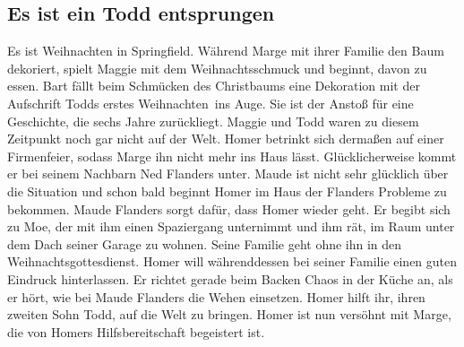 
\subsection{Es ist ein Todd entsprungen}\label{QABF09}
Es ist Weihnachten in Springfield. Während Marge mit ihrer Familie den Baum dekoriert, spielt Maggie mit dem Weihnachtsschmuck und beginnt, davon zu essen. Bart fällt beim Schmücken des Christbaums eine Dekoration mit der Aufschrift \glqq Todds erstes Weihnachten\grqq\ ins Auge. Sie ist der Anstoß für eine Geschichte, die sechs Jahre zurückliegt. Maggie und Todd waren zu diesem Zeitpunkt noch gar nicht auf der Welt. Homer betrinkt sich dermaßen auf einer Firmenfeier, sodass Marge ihn nicht mehr ins Haus lässt. Glücklicherweise kommt er bei seinem Nachbarn Ned Flanders unter. Maude ist nicht sehr glücklich über die Situation und schon bald beginnt Homer im Haus der Flanders Probleme zu bekommen. Maude Flanders sorgt dafür, dass Homer wieder geht. Er begibt sich zu Moe, der mit ihm einen Spaziergang unternimmt und ihm rät, im Raum unter dem Dach seiner Garage zu wohnen. Seine Familie geht ohne ihn in den Weihnachtsgottesdienst. Homer will währenddessen bei seiner Familie einen guten Eindruck hinterlassen. Er richtet gerade beim Backen Chaos in der Küche an, als er hört, wie bei Maude Flanders die Wehen einsetzen. Homer hilft ihr, ihren zweiten Sohn Todd, auf die Welt zu bringen. Homer ist nun versöhnt mit Marge, die von Homers Hilfsbereitschaft begeistert ist.



